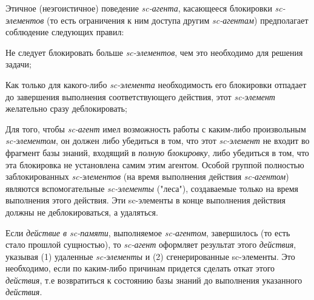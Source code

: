 \begin{textitemize}
	\vspace{\parskip}
	Этичное (неэгоистичное) поведение \textit{sc-агента}, касающееся блокировки \textit{sc-элементов} (то есть ограничения к ним доступа другим \textit{sc-агентам}) предполагает соблюдение следующих правил:
	\begin{textitemize}
		\item Не следует блокировать больше \textit{sc-элементов}, чем это необходимо для решения задачи;
		\item Как только для какого-либо \textit{sc-элемента} необходимость его блокировки отпадает до завершения выполнения соответствующего действия, этот \textit{sc-элемент} желательно сразу деблокировать;
	\end{textitemize}
	\vspace{-2\parskip}
	Для того, чтобы \textit{sc-агент} имел возможность работы с каким-либо произвольным \textit{sc-элементом}, он должен либо убедиться в том, что этот \textit{sc-элемент} не входит во фрагмент базы знаний, входящий в \textit{полную блокировку}, либо убедиться в том, что эта блокировка не установлена самим этим агентом. Особой группой полностью заблокированных \textit{sc-элементов} (на время выполнения действия \textit{\mbox{sc-агентом}}) являются вспомогательные \textit{sc-элементы} ("леса"{}), создаваемые только на время выполнения этого действия. Эти sc-элементы в конце выполнения действия должны не деблокироваться, а удаляться.
	\vspace{\parskip}
	
	\item Если \textit{действие в sc-памяти}, выполняемое \textit{sc-агентом}, завершилось (то есть стало прошлой сущностью), то \textit{sc-агент} оформляет результат этого \textit{действия}, указывая (1) удаленные \textit{sc-элементы} и (2) сгенерированные sc-элементы. Это необходимо, если по каким-либо причинам придется сделать откат этого \textit{действия}, т.е возвратиться к состоянию базы знаний до выполнения указанного \textit{действия}.
\end{textitemize}

